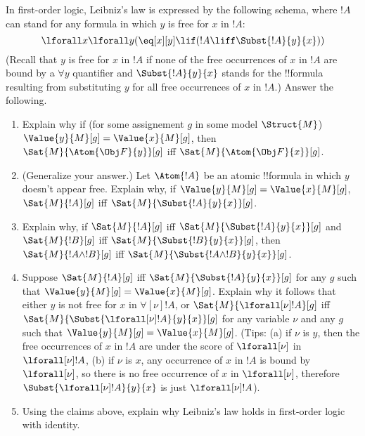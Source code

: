 \documentclass[../../../../include/open-logic-section]{subfiles}
\begin{document}
\begin{prob}
In first-order logic, Leibniz's law is expressed by the following schema, where $!A$ can stand for any formula in which $y$ is free for $x$ in $!A$:
$$\lforall x \lforall y (\eq[x][y] \lif (!A \liff \Subst{!A}{y}{x}))$$
(Recall that $y$ is free for $x$ in $!A$ if none of the free occurrences of $x$ in $!A$ are bound by a $\forall y$ quantifier and $\Subst{!A}{y}{x}$ stands for the !!{formula} resulting from substituting $y$ for all free occurrences of $x$ in $!A$.) Answer the following.
\begin{enumerate}
	\item Explain why if (for some assignement $g$ in some model $\Struct{M}$) $\Value{y}{M}[g] = \Value{x}{M}[g]$, then $\Sat{M}{\Atom{\Obj F}{y}}[g]$ iff $\Sat{M}{\Atom{\Obj F}{x}}[g]$. 
	\item (Generalize your answer.) Let $\Atom{!A}$ be an atomic !!{formula} in which $y$ doesn't appear free. Explain why, if $\Value{y}{M}[g] = \Value{x}{M}[g]$, $\Sat{M}{!A}[g]$ iff $\Sat{M}{\Subst{!A}{y}{x}}[g]$.
	\item Explain why, if $\Sat{M}{!A}[g]$ iff $\Sat{M}{\Subst{!A}{y}{x}}[g]$ and $\Sat{M}{!B}[g]$ iff $\Sat{M}{\Subst{!B}{y}{x}}[g]$, then $\Sat{M}{!A \land !B}[g]$ iff $\Sat{M}{\Subst{!A \land !B}{y}{x}}[g]$.
	\item Suppose $\Sat{M}{!A}[g]$ iff $\Sat{M}{\Subst{!A}{y}{x}}[g]$ for any $g$ such that $\Value{y}{M}[g] = \Value{x}{M}[g]$. Explain why it follows that either $y$ is not free for $x$ in $\forall[\nu]!A$, or $\Sat{M}{\lforall[\nu]!A}[g]$ iff $\Sat{M}{\Subst{\lforall[\nu]!A}{y}{x}}[g]$ for any variable $\nu$ and any $g$ such that $\Value{y}{M}[g] = \Value{x}{M}[g]$. (Tips: (a) if $\nu$ is $y$, then the free occurrences of $x$ in $!A$ are under the score of $\lforall[\nu]$ in $\lforall[\nu]!A$, (b) if $\nu$ is $x$, any occurrence of $x$ in $!A$ is bound by $\lforall[\nu]$, so there is no free occurrence of $x$ in $\lforall[\nu]$, therefore  $\Subst{\lforall[\nu]!A}{y}{x}$ is just $\lforall[\nu]!A$).
	\item Using the claims above, explain why Leibniz's law holds in first-order logic with identity. 
\end{enumerate}
\end{prob}
\end{document}
